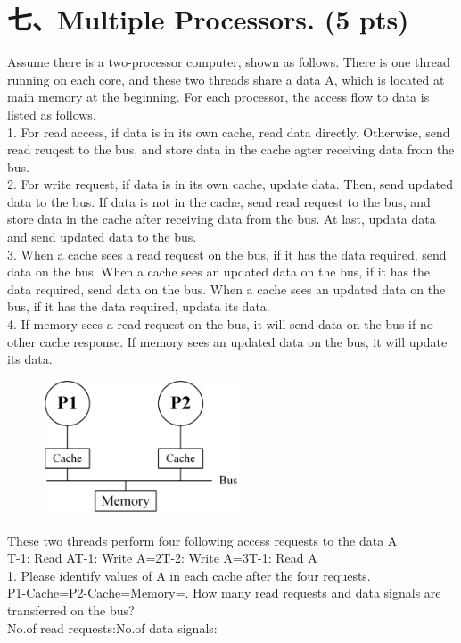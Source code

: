 \documentclass[UTF8]{ctexart}
\begin{document}
\section*{七、Multiple Processors. (5 pts)}
Assume there is a two-processor computer, shown as follows. There is one thread running on each core, and these two threads share a data A, which is located
at main memory at the beginning. For each processor, the access flow to data is listed as follows.\\
1. For read access, if data is in its own cache, read data directly. Otherwise, send read reuqest to the bus, and store data in the cache agter receiving data 
from the bus.\\
2. For write request, if data is in its own cache, update data. Then, send updated data to the bus. If data is not in the cache, send read request to the bus, 
and store data in the cache after receiving data from the bus. At last, updata data and send updated data to the bus.\\
3. When a cache sees a read request on the bus, if it has the data required, send data on the bus. When a cache sees an updated data on the bus, if it has the 
data required, send data on the bus. When a cache sees an updated data on the bus, if it has the data required, updata its data.\\
4. If memory sees a read request on the bus, it will send data on the bus if no other cache response. If memory sees an updated data on the bus, it will update 
its data.\\
\begin{figure}[H]                                            
    \centering                                                
    \includegraphics[width=6cm,height=4cm]{7.png}        
    \caption*{}                                                                                 
\end{figure}  
These two threads perform four following access requests to the data A\\
T-1: Read A\quad\quad T-1: Write A=2\quad\quad T-2: Write A=3\quad\quad T-1: Read A\\
1. Please identify values of A in each cache after the four requests.\\
P1-Cache=\quad\quad P2-Cache=\quad\quad Memory=\quad{}. How many read requests and data signals are transferred on the bus?\\
No.of read requests:\quad\quad No.of data signals:\\
\end{document}
